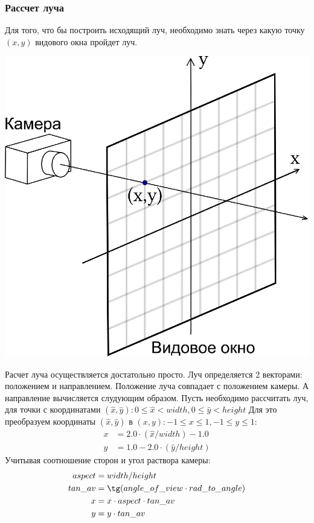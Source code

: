 \documentclass[12pt, a4paper]{article}
\begin{document}
\subsubsection{Рассчет луча}

Для того, что бы построить исходящий луч, необходимо знать через какую точку $(x,y)$ видового окна пройдет луч.

\begin{center}
\includegraphics[scale=0.75]{imgs/camera.eps} 
\end{center}

Расчет луча осуществляется достатольно просто. Луч определяется 2 векторами: положением и направлением. Положение луча совпадает с положением камеры. А направление вычисляется слудующим образом.
Пусть необходимо рассчитать луч, для точки с координатами $(\hat x, \hat y) : 0 \le \hat x < width, 0 \le \hat y < height$
Для это преобразуем координаты $(\hat x, \hat y)$ в $(x, y) : -1 \le x \le 1, -1 \le y \le 1$:
\begin{equation*}
\begin{split}
x &= 2.0 \cdot (\hat x / width) - 1.0{}\\
y &= 1.0 - 2.0 \cdot (\hat y / height)
\end{split}
\end{equation*}
Учитывая соотношение сторон и угол раствора камеры:
\begin{equation*}
\begin{split}
aspect &= width / height \\
tan\_av &= \tg(angle\_of\_view \cdot rad\_to\_angle) \\
x &= x \cdot aspect \cdot tan\_av \\
y &= y \cdot tan\_av
\end{split}
\end{equation*}
\end{document}
